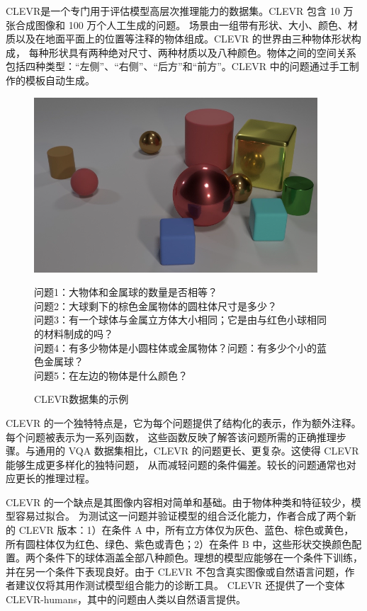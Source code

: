 CLEVR\cite{johnson2017clevr}是一个专门用于评估模型高层次推理能力的数据集。CLEVR 包含 10 万张合成图像和 100 万个人工生成的问题。
场景由一组带有形状、大小、颜色、材质以及在地面平面上的位置等注释的物体组成。CLEVR 的世界由三种物体形状构成，
每种形状具有两种绝对尺寸、两种材质以及八种颜色。物体之间的空间关系包括四种类型：“左侧”、“右侧”、“后方”和“前方”。CLEVR 中的问题通过手工制作的模板自动生成。

\begin{figure}
    \centering
    \includegraphics[scale=0.5]{figures/clevr-example.png}
    \begin{center}
        \footnotesize 问题1：大物体和金属球的数量是否相等？\\
        \footnotesize 问题2：大球剩下的棕色金属物体的圆柱体尺寸是多少？\\
        \footnotesize 问题3：有一个球体与金属立方体大小相同；它是由与红色小球相同的材料制成的吗？\\
        \footnotesize 问题4：有多少物体是小圆柱体或金属物体？问题：有多少个小的蓝色金属球？\\
        \footnotesize 问题5：在左边的物体是什么颜色？
    \end{center}
    \caption{CLEVR数据集的示例}
    \label{fig:clevr-example}
\end{figure}

CLEVR 的一个独特特点是，它为每个问题提供了结构化的表示，作为额外注释。每个问题被表示为一系列函数，
这些函数反映了解答该问题所需的正确推理步骤。与通用的 VQA 数据集相比，CLEVR 的问题更长、更复杂。这使得 CLEVR 能够生成更多样化的独特问题，
从而减轻问题的条件偏差。较长的问题通常也对应更长的推理过程。

CLEVR 的一个缺点是其图像内容相对简单和基础。由于物体种类和特征较少，模型容易过拟合。
为测试这一问题并验证模型的组合泛化能力，作者合成了两个新的 CLEVR 版本：1）在条件 A 中，所有立方体仅为灰色、蓝色、棕色或黄色，
所有圆柱体仅为红色、绿色、紫色或青色；2）在条件 B 中，这些形状交换颜色配置。两个条件下的球体涵盖全部八种颜色。理想的模型应能够在一个条件下训练，
并在另一个条件下表现良好。由于 CLEVR 不包含真实图像或自然语言问题，作者建议仅将其用作测试模型组合能力的诊断工具。
CLEVR 还提供了一个变体 CLEVR-humans，其中的问题由人类以自然语言提供。
